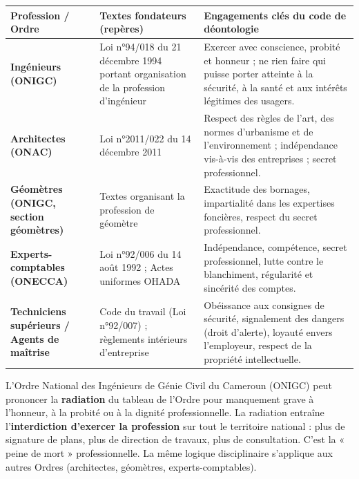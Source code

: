 \documentclass[11pt]{article}
\begin{document}
\begin{center}
\begin{tabularx}{\linewidth}{|l|X|X|}\hline
\rowcolor{popblueL}\textbf{Profession / Ordre} & \textbf{Textes fondateurs (repères)} & \textbf{Engagements clés du code de déontologie} \\ \hline
\textbf{Ingénieurs (ONIGC)} & Loi n°94/018 du 21 décembre 1994 portant organisation de la profession d'ingénieur & Exercer avec conscience, probité et honneur ; ne rien faire qui puisse porter atteinte à la sécurité, à la santé et aux intérêts légitimes des usagers. \\ \hline
\textbf{Architectes (ONAC)} & Loi n°2011/022 du 14 décembre 2011 & Respect des règles de l'art, des normes d'urbanisme et de l'environnement ; indépendance vis-à-vis des entreprises ; secret professionnel. \\ \hline
\textbf{Géomètres (ONIGC, section géomètres)} & Textes organisant la profession de géomètre & Exactitude des bornages, impartialité dans les expertises foncières, respect du secret professionnel. \\ \hline
\textbf{Experts-comptables (ONECCA)} & Loi n°92/006 du 14 août 1992 ; Actes uniformes OHADA & Indépendance, compétence, secret professionnel, lutte contre le blanchiment, régularité et sincérité des comptes. \\ \hline
\textbf{Techniciens supérieurs / Agents de maîtrise} & Code du travail (Loi n°92/007) ; règlements intérieurs d'entreprise & Obéissance aux consignes de sécurité, signalement des dangers (droit d'alerte), loyauté envers l'employeur, respect de la propriété intellectuelle. \\ \hline
\end{tabularx}
\end{center}

\begin{savaistu}
L'Ordre National des Ingénieurs de Génie Civil du Cameroun (ONIGC) peut prononcer la \textbf{radiation} du tableau de l'Ordre pour manquement grave à l'honneur, à la probité ou à la dignité professionnelle. La radiation entraîne l'\textbf{interdiction d'exercer la profession} sur tout le territoire national : plus de signature de plans, plus de direction de travaux, plus de consultation. C'est la « peine de mort » professionnelle. La même logique disciplinaire s'applique aux autres Ordres (architectes, géomètres, experts-comptables).
\end{savaistu}
\end{document}
